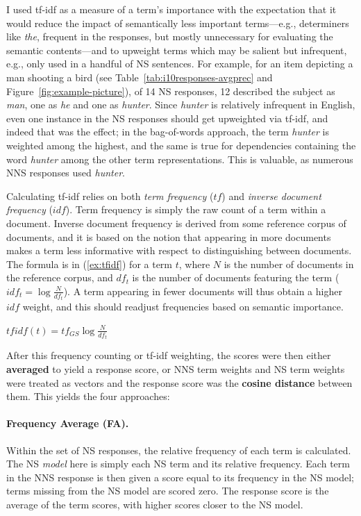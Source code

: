 I used tf-idf as a measure of a term's importance with the expectation that it would reduce the impact
of semantically less important terms---e.g., determiners like
\textit{the}, frequent in the responses, but mostly unnecessary for evaluating the
semantic contents---and to upweight terms which may
be salient but infrequent, e.g., only used in a handful of NS
sentences. For example, for an item depicting a man shooting a bird
(see Table~\ref{tab:i10responses-avgprec} and Figure~\ref{fig:example-picture}), of 14 NS responses, 12 described the subject as \textit{man}, one as \textit{he} and one as
\textit{hunter}. Since \textit{hunter} is relatively infrequent in English, even
one instance in the NS responses should get upweighted via tf-idf, and indeed
that was the effect; in the bag-of-words approach, the term \textit{hunter} is weighted among the highest, and the same is true for dependencies containing the word \textit{hunter} among the other term representations. This is valuable, as numerous NNS responses used \textit{hunter}.

Calculating tf-idf relies on both \emph{term frequency} ($tf$) and
\emph{inverse document frequency} ($idf$).  Term frequency is simply
the raw count of a term within a document. Inverse document frequency is derived from some reference corpus of documents, and it is based on the notion that appearing in more documents makes a term less informative with respect
to distinguishing between documents.  The formula is in
(\ref{ex:tfidf}) for a term $t$, where $N$ is the number of documents
in the reference corpus, and $df_{t}$ is the number of documents
featuring the term ($idf_{t} = \log \frac{N}{df_{t}}$).  A term
appearing in fewer documents will thus obtain a higher $idf$ weight,
and this should readjust frequencies based on semantic importance.

\begin{exe}
\ex\label{ex:tfidf} $tfidf(t) = tf_{GS} \log \frac{N}{df_{t}}$
\end{exe}

After this frequency counting or tf-idf weighting, the scores were then either
\textbf{averaged} to yield a response score, or NNS term
weights and NS term weights were treated as vectors and the response
score was the \textbf{cosine distance} between them.  This
yields the four approaches:

\paragraph{Frequency Average (FA).} 
Within the set of NS responses, the relative frequency of each term is calculated. The NS \textit{model} here is simply each NS term and its relative frequency. Each term in
the NNS response is then given a score equal to its frequency in the
NS model; terms missing from the NS model are scored zero. The response score is
the average of the term scores, with higher scores closer to the NS model.

